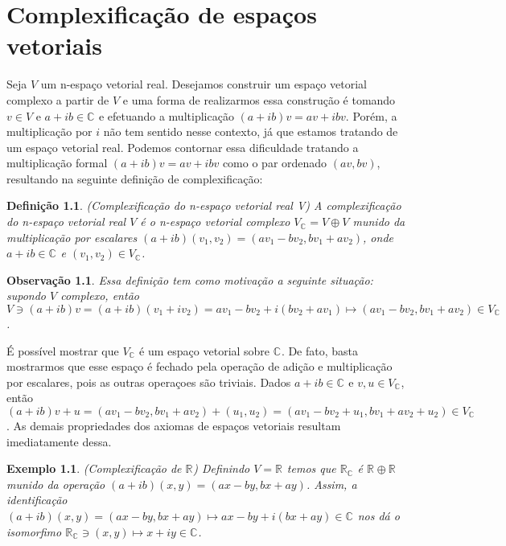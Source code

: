 \documentclass[12pt]{book}
\newtheorem{definicao}[teorema]{Definição}
\newtheorem{exemplo}[teorema]{Exemplo}
\newtheorem{observacao}[teorema]{Observação}
\newcommand{\complexificacao}[1]{#1_{\complexo{}}}
\newcommand{\complexo}[1]{\mathbb{C}^{#1}}
\newcommand{\real}[1]{\mathbb{R}^{#1}}
\newcommand{\reta}{\real{}}
\begin{document}
	\appendix
	
	\chapter{Complexificação de espaços vetoriais}\label{apendice_complexificacao_espacos_vetoriais}
	
	Seja $V$ um n-espaço vetorial real. Desejamos construir um espaço vetorial complexo a partir de $V$ e uma forma de realizarmos essa construção é tomando $v \in V $ e $a+ib \in \complexo{}$ e efetuando a multiplicação $(a+ib)v = av+ibv$. Porém, a multiplicação por $i$ não tem sentido nesse contexto, já que estamos tratando de um espaço vetorial real. Podemos contornar essa dificuldade tratando a multiplicação formal $(a+ib)v = av+ibv$ como o par ordenado $(av, bv)$, resultando na seguinte definição de complexificação:
	
	\begin{definicao}
		(Complexificação do n-espaço vetorial real V) A complexificação do n-espaço vetorial real $V$ é o n-espaço vetorial complexo $\complexificacao{V}=V\oplus V$ munido da multiplicação por escalares $(a+ib)(v_{1}, v_{2}) = (av_{1}-bv_{2}, bv_{1}+ av_{2})$, onde $a+ib \in \complexo{}$ e $(v_{1}, v_{2})\in \complexificacao{V}$.
	\end{definicao}
	
	\begin{observacao}
		Essa definição tem como motivação a seguinte situação: supondo $V$ complexo, então $V \ni (a+ib)v = (a+ib)(v_{1}+iv_{2}) = av_{1}-bv_{2}+i(bv_{2}+av_{1}) \mapsto (av_{1}-bv_{2}, bv_{1}+ av_{2}) \in \complexificacao{V}$.
	\end{observacao}
	
	É possível mostrar que $\complexificacao{V}$ é um espaço vetorial sobre $\complexo{}$. De fato, basta mostrarmos que esse espaço é fechado pela operação de adição e multiplicação por escalares, pois as outras operaçoes são triviais. Dados $a+ib \in \complexo{}$ e $v,u \in \complexificacao{V}$, então $(a+ib )v+u = (av_{1}-bv_{2}, bv_{1}+ av_{2}) + (u_{1}, u_{2}) = (av_{1}-bv_{2} + u_{1}, bv_{1}+ av_{2} + u_{2}) \in \complexificacao{V}$. As demais propriedades dos axiomas de espaços vetoriais resultam imediatamente dessa.
	
	\begin{exemplo}\label{exemplo_conjugado_reta_real}
		(Complexificação de $\reta$) Definindo $V = \reta$ temos que $\complexificacao{\reta}$ é $\reta\oplus \reta$ munido da operação $(a+ib)(x,y) = (ax-by, bx+ay)$. Assim, a identificação $(a+ib)(x, y ) = (ax-by, bx+ay) \mapsto ax-by+i(bx+ay) \in \complexo{}$ nos dá o isomorfimo $\complexificacao{\reta} \ni (x,y)\mapsto x +iy\in \complexo{}$.
	\end{exemplo}
	
\end{document}
